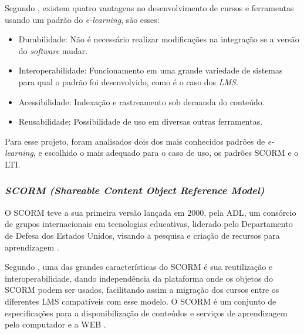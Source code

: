 Segundo , existem quatro vantagens no desenvolvimento de cursos e ferramentas usando um padrão do \textit{e-learning}, são esses:
\begin{itemize}
  \item Durabilidade: Não é necessário realizar modificações na integração se a versão do \textit{software} mudar.
  \item Interoperabilidade: Funcionamento em uma grande variedade de sistemas para qual o padrão foi desenvolvido, como é o caso dos \textit{LMS}.
  \item Acessibilidade: Indexação e rastreamento sob demanda do conteúdo.
  \item Reusabilidade: Possibilidade de uso em diversas outras ferramentas.
\end{itemize}

Para esse projeto, foram analisados dois dos mais conhecidos padrões de \textit{e-learning}, e escolhido o mais adequado para o caso de uso, os padrões \ac{SCORM} e o \ac{LTI}.

\subsubsection{\textit{SCORM (Shareable Content Object Reference Model)}}
O \ac{SCORM} teve a sua primeira versão lançada em 2000, pela \ac{ADL}, um consórcio de grupos internacionais em tecnologias educativas, liderado pelo Departamento de Defesa dos Estados Unidos, visando a pesquisa e criação de recursos para aprendizagem \cite{adl}.

Segundo , uma das grandes características do \ac{SCORM} é sua reutilização e interoperabilidade, dando independência da plataforma onde os objetos do SCORM podem ser usados, facilitando assim a migração dos cursos entre os diferentes \ac{LMS} compatíveis com esse modelo. O \ac{SCORM} é um conjunto de especificações para a disponibilização de conteúdos e serviços de aprendizagem pelo computador e a \ac{WEB} \cite{adl}.


